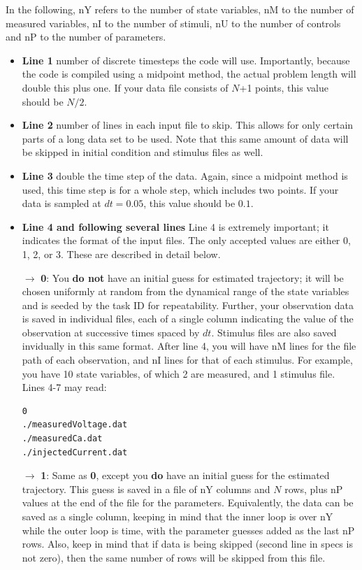 \documentclass[11pt]{article}
\begin{document}
{  In the following, nY refers to the number of state variables, nM to the number of measured variables, nI to the number of stimuli, nU to the number of controls and nP to the number of parameters.

\begin{itemize}

\item {\bf Line 1} number of discrete timesteps the code will use.  Importantly, because the code is compiled using a midpoint method, the actual problem length will double this plus one. If your data file consists of $N$+1 points, this value should be $N/2$.
\item {\bf Line 2} number of lines in each input file to skip.  This allows for only certain parts of a long data set to be used. Note that this same amount of data will be skipped in initial condition and stimulus files as well.
\item {\bf Line 3} double the time step of the data. Again, since a midpoint method is used, this time step is for a whole step, which includes two points. If your data is sampled at $dt = 0.05$, this value should be $0.1$.
\item {\bf Line 4 and following several lines} Line 4 is extremely important; it indicates the format of the input files. The only accepted values are  either 0, 1, 2, or 3. These are described in detail below.


\item[$\rightarrow$] {\bf 0}: You {\bf do not} have an initial guess for estimated trajectory; it will be chosen uniformly at random from the dynamical range of the state variables and is seeded by the task ID for repeatability. Further, your observation data is saved in individual files, each of a single column indicating the value of the observation at successive times spaced by $dt$. Stimulus files are also saved invidually in this same format. After line 4, you will have nM lines for the file path of each observation, and nI lines for that of each stimulus. For example, you have 10 state variables, of which 2 are measured, and 1 stimulus file. Lines 4-7 may read:

\begin{verbatim}
0
./measuredVoltage.dat
./measuredCa.dat
./injectedCurrent.dat
\end{verbatim}

\item[$\rightarrow$] {\bf 1}: Same as {\bf 0}, except you {\bf do} have an initial guess for the estimated trajectory. This guess is saved in a file of nY columns and $N$ rows, plus nP values at the end of the file for the parameters. Equivalently, the data can be saved as a single column, keeping in mind that the inner loop is over nY while the outer loop is time, with the parameter guesses added as the last nP rows. Also, keep in mind that if data is being skipped (second line in specs is not zero), then the same number of rows will be skipped from this file. 


\end{itemize}}
\end{document}

